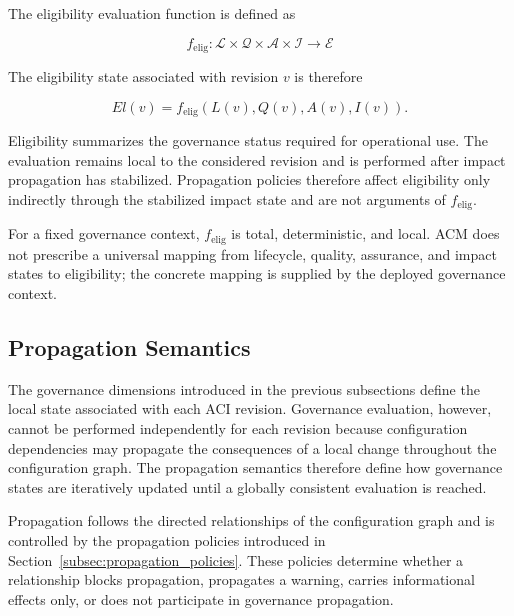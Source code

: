 \documentclass[10pt]{article}
\begin{document}
The eligibility evaluation function is defined as

\begin{equation}
	\label{eq:eligibility_function}
	f_{\mathrm{elig}}
	:
	\mathcal{L}
	\times
	\mathcal{Q}
	\times
	\mathcal{A}
	\times
	\mathcal{I}
	\rightarrow
	\mathcal{E}
\end{equation}

The eligibility state associated with revision $v$ is therefore

\begin{equation}
	El(v)=
	f_{\mathrm{elig}}
	\left(
	L(v),
	Q(v),
	A(v),
	I(v)
	\right).
	\label{eq:eligibility_assignment}
\end{equation}

Eligibility summarizes the governance status required for operational use. The evaluation remains local to the considered revision and is performed after impact propagation has stabilized. Propagation policies therefore affect eligibility only indirectly through the stabilized impact state and are not arguments of $f_{\mathrm{elig}}$.

For a fixed governance context, $f_{\mathrm{elig}}$ is total, deterministic, and local. ACM does not prescribe a universal mapping from lifecycle, quality, assurance, and impact states to eligibility; the concrete mapping is supplied by the deployed governance context.

\subsection{Propagation Semantics}
\label{subsec:propagation_semantics}

The governance dimensions introduced in the previous subsections define the local state associated with each ACI revision. Governance evaluation, however, cannot be performed independently for each revision because configuration dependencies may propagate the consequences of a local change throughout the configuration graph. The propagation semantics therefore define how governance states are iteratively updated until a globally consistent evaluation is reached.

Propagation follows the directed relationships of the configuration graph and is controlled by the propagation policies introduced in
Section~\ref{subsec:propagation_policies}. These policies determine whether a relationship blocks propagation, propagates a warning, carries informational effects only, or does not participate in governance propagation.
\end{document}
